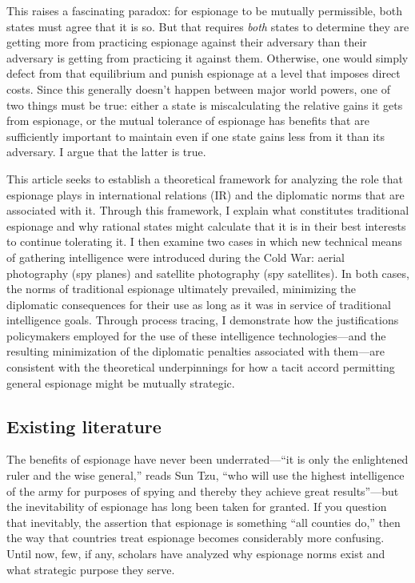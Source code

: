 \documentclass[14pt]{extarticle}
\begin{document}
This raises a fascinating paradox: for espionage to be mutually permissible, both states must agree that it is so. But that requires \emph{both} states to determine they are getting more from practicing espionage against their adversary than their adversary is getting from practicing it against them. Otherwise, one would simply defect from that equilibrium and punish espionage at a level that imposes direct costs. Since this generally doesn't happen between major world powers, one of two things must be true: either a state is miscalculating the relative gains it gets from espionage, or the mutual tolerance of espionage has benefits that are sufficiently important to maintain even if one state gains less from it than its adversary. I argue that the latter is true.

This article seeks to establish a theoretical framework for analyzing the role that espionage plays in international relations (IR) and the diplomatic norms that are associated with it. Through this framework, I explain what constitutes traditional espionage and why rational states might calculate that it is in their best interests to continue tolerating it. I then examine two cases in which new technical means of gathering intelligence were introduced during the Cold War: aerial photography (spy planes) and satellite photography (spy satellites). In both cases, the norms of traditional espionage ultimately prevailed, minimizing the diplomatic consequences for their use as long as it was in service of traditional intelligence goals. Through process tracing, I demonstrate how the justifications policymakers employed for the use of these intelligence technologies---and the resulting minimization of the diplomatic penalties associated with them---are consistent with the theoretical underpinnings for how a tacit accord permitting general espionage might be mutually strategic.

\subsection{Existing literature}
The benefits of espionage have never been underrated---\enquote{it is only the enlightened ruler and the wise general,} reads Sun Tzu, \enquote{who will use the highest intelligence of the army for purposes of spying and thereby they achieve great results}---but the inevitability of espionage has long been taken for granted. If you question that inevitably, the assertion that espionage is something \enquote{all counties do,} then the way that countries treat espionage becomes considerably more confusing. Until now, few, if any, scholars have analyzed why espionage norms exist and what strategic purpose they serve.
\end{document}

